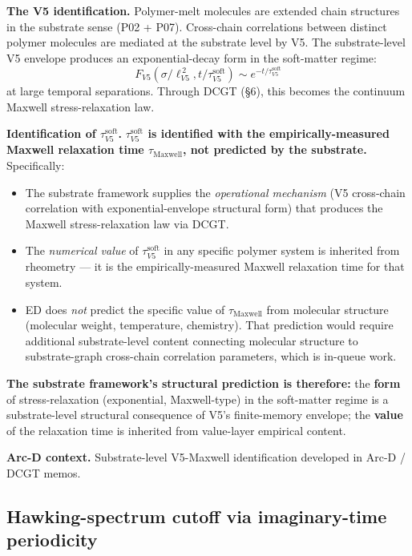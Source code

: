 \documentclass[11pt,a4paper]{article}
\begin{document}
\textbf{The V5 identification.} Polymer-melt molecules are extended chain structures in the substrate sense (P02 + P07). Cross-chain correlations between distinct polymer molecules are mediated at the substrate level by V5. The substrate-level V5 envelope produces an exponential-decay form in the soft-matter regime:
\[
F_{V5}(\sigma/\ell_{V5}^{\,2}, t/\tau_{V5}^\mathrm{soft}) \sim e^{-t/\tau_{V5}^\mathrm{soft}}
\]
at large temporal separations. Through DCGT (\S6), this becomes the continuum Maxwell stress-relaxation law.

\textbf{Identification of $\tau_{V5}^\mathrm{soft}$.} \textbf{$\tau_{V5}^\mathrm{soft}$ is identified with the empirically-measured Maxwell relaxation time $\tau_\mathrm{Maxwell}$, not predicted by the substrate.} Specifically:

\begin{itemize}[noitemsep]
\item The substrate framework supplies the \emph{operational mechanism} (V5 cross-chain correlation with exponential-envelope structural form) that produces the Maxwell stress-relaxation law via DCGT.
\item The \emph{numerical value} of $\tau_{V5}^\mathrm{soft}$ in any specific polymer system is inherited from rheometry --- it is the empirically-measured Maxwell relaxation time for that system.
\item ED does \emph{not} predict the specific value of $\tau_\mathrm{Maxwell}$ from molecular structure (molecular weight, temperature, chemistry). That prediction would require additional substrate-level content connecting molecular structure to substrate-graph cross-chain correlation parameters, which is in-queue work.
\end{itemize}

\textbf{The substrate framework's structural prediction is therefore:} the \textbf{form} of stress-relaxation (exponential, Maxwell-type) in the soft-matter regime is a substrate-level structural consequence of V5's finite-memory envelope; the \textbf{value} of the relaxation time is inherited from value-layer empirical content.

\textbf{Arc-D context.} Substrate-level V5-Maxwell identification developed in Arc-D / DCGT memos.

\subsection{Hawking-spectrum cutoff via imaginary-time periodicity}
\end{document}
